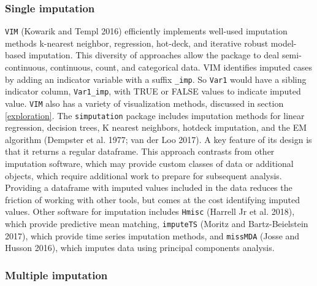 \documentclass[]{article}
\theoremstyle{definition}
\theoremstyle{definition}
\theoremstyle{definition}
\theoremstyle{remark}
\begin{document}
\hypertarget{single-imputation}{%
\subsubsection{Single imputation}\label{single-imputation}}

\texttt{VIM} (Kowarik and Templ 2016) efficiently implements well-used
imputation methods k-nearest neighbor, regression, hot-deck, and
iterative robust model-based imputation. This diversity of approaches
allow the package to deal semi-continuous, continuous, count, and
categorical data. VIM identifies imputed cases by adding an indicator
variable with a suffix \texttt{\_imp}. So \texttt{Var1} would have a
sibling indicator column, \texttt{Var1\_imp}, with TRUE or FALSE values
to indicate imputed value. \texttt{VIM} also has a variety of
visualization methods, discussed in section \ref{exploration}. The
\texttt{simputation} package includes imputation methods for linear
regression, decision trees, K nearest neighbors, hotdeck imputation, and
the EM algorithm (Dempster et al. 1977; van der Loo 2017). A key feature
of its design is that it returns a regular dataframe. This approach
contrasts from other imputation software, which may provide custom
classes of data or additional objects, which require additional work to
prepare for subsequent analysis. Providing a dataframe with imputed
values included in the data reduces the friction of working with other
tools, but comes at the cost identifying imputed values. Other software
for imputation includes \texttt{Hmisc} (Harrell Jr et al. 2018), which
provide predictive mean matching, \texttt{imputeTS} (Moritz and
Bartz-Beielstein 2017), which provide time series imputation methods,
and \texttt{missMDA} (Josse and Husson 2016), which imputes data using
principal components analysis.

\hypertarget{multiple-imputation}{%
\subsubsection{Multiple imputation}\label{multiple-imputation}}
\end{document}
